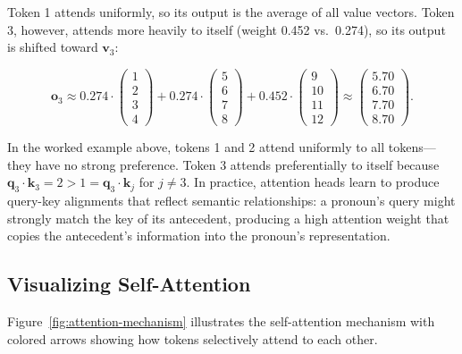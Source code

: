 Token 1 attends uniformly, so its output is the average of all value vectors. Token 3, however, attends more heavily to itself (weight 0.452 vs.\ 0.274), so its output is shifted toward $\mathbf{v}_3$:

\begin{equation}
\mathbf{o}_3 \approx 0.274 \cdot \begin{pmatrix}1\\2\\3\\4\end{pmatrix} + 0.274 \cdot \begin{pmatrix}5\\6\\7\\8\end{pmatrix} + 0.452 \cdot \begin{pmatrix}9\\10\\11\\12\end{pmatrix} \approx \begin{pmatrix}5.70\\6.70\\7.70\\8.70\end{pmatrix}.
\end{equation}

\begin{example}
In the worked example above, tokens 1 and 2 attend uniformly to all tokens---they have no strong preference. Token 3 attends preferentially to itself because $\mathbf{q}_3 \cdot \mathbf{k}_3 = 2 > 1 = \mathbf{q}_3 \cdot \mathbf{k}_j$ for $j \neq 3$. In practice, attention heads learn to produce query-key alignments that reflect semantic relationships: a pronoun's query might strongly match the key of its antecedent, producing a high attention weight that copies the antecedent's information into the pronoun's representation.
\end{example}

\subsection{Visualizing Self-Attention}

Figure~\ref{fig:attention-mechanism} illustrates the self-attention mechanism with colored arrows showing how tokens selectively attend to each other.

